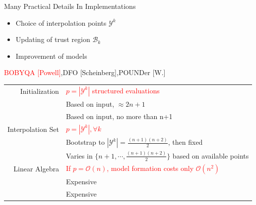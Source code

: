 \documentclass[handout,aspectratio=54]{beamer}
\numberwithin{theorem}{section}
\begin{document}
\begin{frame}{Many Practical Details In Implementations}
\begin{itemize}
\item Choice of interpolation points $\mathcal{Y}^k$
\item Updating of trust region $\mathcal{B}_k$
\item Improvement of models
\end{itemize}

\ttfamily
\textcolor{red}{BOBYQA [Powell]},\textcolor[RGB]{0,130,80}{DFO [Scheinberg]},\textcolor[RGB]{128,0,128}{POUNDer [W.]}
\sffamily

\begin{table}[]\small
\begin{tabular}{rl}
Initialization   & \textcolor{red}{$p=|\mathcal{Y}^k|$ structured evaluations} \\
&\textcolor[RGB]{0,130,80}{Based on input, $\approx 2n+1$}\\
&\textcolor[RGB]{128,0,128}{Based on input, no more than n+1}\\
Interpolation Set & \textcolor{red}{$p=|\mathcal{Y}^k|,\forall k$}\\
&\textcolor[RGB]{0,130,80}{Bootstrap to $|\mathcal{Y}^k|=\frac{(n+1)(n+2)}{2}$, then fixed}\\
&\textcolor[RGB]{128,0,128}{Varies in $\{n+1,\cdots,\frac{(n+1)(n+2)}{2}\}$ based on available points}\\
Linear Algebra   & \textcolor{red}{If $p = \mathcal{O}(n)$, model formation costs only $\mathcal{O}(n^2)$}\\
&\textcolor[RGB]{0,130,80}{Expensive}\\
&\textcolor[RGB]{128,0,128}{Expensive}\\
\end{tabular}
\end{table}
\end{frame}
\end{document}
